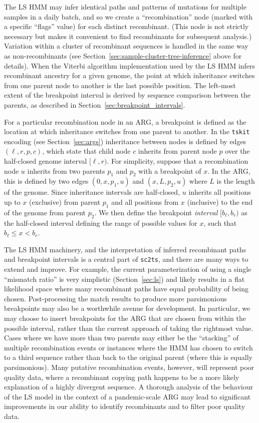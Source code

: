 \documentclass{article}
\begin{document}
The LS HMM may infer identical paths and patterns of mutations
for multiple samples in a daily batch, and so we
create a ``recombination'' node (marked with a specific ``flags'' value)
for each distinct recombinant. (This node is not strictly necessary
but makes it convenient to find recombinants for subsequent analysis.)
Variation within a cluster
of recombinant sequences is handled in the same way as non-recombinants
(see Section~\ref{sec:sample-cluster-tree-inference} above for details).
When the Viterbi algorithm implementation used by the LS HMM infers
recombinant ancestry for a given genome, the point at which inheritance
switches from one parent node to another is the last possible
position. The left-most extent of the breakpoint interval is derived
by sequence comparison between the parents, as described in
Section~\ref{sec:breakpoint_intervals}.

For a particular recombination node in an ARG, a  breakpoint
is defined as the location at which inheritance switches from one parent
to another.
In the \texttt{tskit} encoding (see Section~\ref{sec:args}) inheritance between
nodes is defined by edges $(\ell, r, p, c)$, which state that child node $c$
inherits from parent node $p$
over the half-closed genome interval $[\ell, r)$.
For simplicity, suppose that a recombination node $u$ inherits from two
parents $p_1$ and $p_2$ with a breakpoint of $x$.
In the ARG, this is defined by two edges
$(0, x, p_1, u)$ and $(x, L, p_2, u)$ where $L$ is the length of the genome.
Since inheritance intervals are half-closed,
$u$ inherits all positions up to $x$ (exclusive) from parent $p_1$
and all positions from $x$ (inclusive) to the end of the genome from parent
$p_2$. We then define the breakpoint \emph{interval} $[b_\ell, b_r)$ as the
half-closed interval defining the range of possible values for $x$, such
that $b_\ell \leq x < b_r$.

The LS HMM machinery, and the interpretation of inferred recombinant paths and
breakpoint intervals is a central part of \texttt{sc2ts}, and there are many
ways to extend and improve. For example, the current parameterization of using
a single ``mismatch ratio'' is very simplistic (Section~\ref{sec:ls}) and likely
results in a flat likelihood space where many recombinant paths have equal
probability of being chosen.
Post-processing the match results to produce
more parsimonious breakpoints may also be a worthwhile avenue for development.
In particular, we may choose to insert breakpoints for the ARG that are chosen
from within the possible interval, rather than the current approach of taking
the rightmost value. Cases where we have more than two parents may either be
the ``stacking'' of multiple recombination events or instances where
the HMM has chosen to switch to a third sequence rather than back to
the original parent (where this is equally parsimonious). Many putative
recombination events, however, will represent poor quality data, where
a recombinant copying path happens to be a more likely explanation
of a highly divergent sequence.
A thorough analysis of the behaviour of the LS model in the context
of a pandemic-scale ARG may lead to significant improvements in our
ability to identify recombinants and to filter poor quality data.
\end{document}
